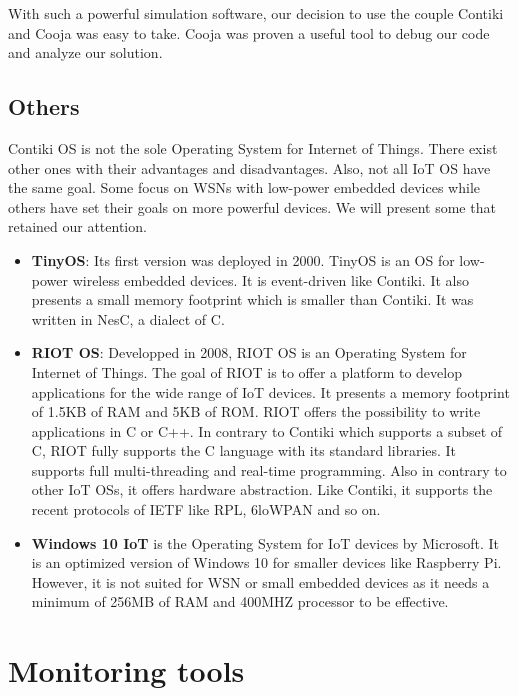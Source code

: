With such a powerful simulation software, our decision to use the couple Contiki and Cooja was easy to take. Cooja was proven a useful tool to debug our code and analyze our solution.

\section{Others}

Contiki OS is not the sole Operating System for Internet of Things. There exist other ones with their advantages and disadvantages. Also, not all IoT OS have the same goal. Some focus on WSNs with low-power embedded devices while others have set their goals on more powerful devices. We will present some that retained our attention.

\begin{itemize}
\item \textbf{TinyOS}: Its first version was deployed in 2000. TinyOS \cite{website:tinyos} is an OS for low-power wireless embedded devices. It is event-driven like Contiki. It also presents a small memory footprint which is smaller than Contiki. It was written in NesC, a dialect of C.
\item \textbf{RIOT OS}: Developped in 2008, RIOT OS \cite{website:riot} \cite{baccelli2013riot} is an Operating System for Internet of Things. The goal of RIOT is to offer a platform to develop applications for the wide range of IoT devices. It presents a memory footprint of 1.5KB of RAM and 5KB of ROM. RIOT offers the possibility to write applications in C or C++. In contrary to Contiki which supports a subset of C, RIOT fully supports the C language with its standard libraries. It supports full multi-threading and real-time programming. Also in contrary to other IoT OSs, it offers hardware abstraction. Like Contiki, it supports the recent protocols of IETF like RPL, 6loWPAN and so on.
\item \textbf{Windows 10 IoT} \cite{website:win10} is the Operating System for IoT devices by Microsoft. It is an optimized version of Windows 10 for smaller devices like Raspberry Pi. However, it is not suited for WSN or small embedded devices as it needs a minimum of 256MB of RAM and 400MHZ processor to be effective.
\end{itemize}

\chapter{Monitoring tools}
\label{chap:monitoring_tools}

